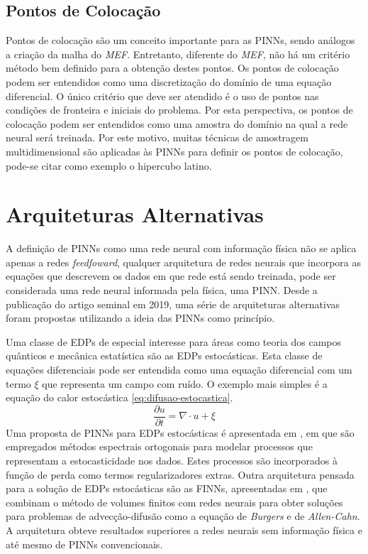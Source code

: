 \subsection{Pontos de Colocação}

Pontos de colocação são um conceito importante para as PINNs, sendo análogos
a criação da malha do \textit{MEF}. Entretanto, diferente do \textit{MEF}, 
não há um critério método bem definido para a obtenção destes pontos. 
Os pontos de colocação podem ser entendidos como uma discretização do domínio
de uma equação diferencial. O único critério que deve ser atendido é o uso
de pontos nas condições de fronteira e iniciais do problema.
Por esta perspectiva, os pontos de colocação podem ser entendidos como uma 
amostra do domínio na qual a rede neural será treinada. 
Por este motivo, muitas técnicas de amostragem multidimensional são 
aplicadas às PINNs para definir os pontos de colocação, pode-se citar como 
exemplo o hipercubo latino.

\section{Arquiteturas Alternativas}

A definição de PINNs como uma rede neural com informação física não se aplica
apenas a redes \textit{feedfoward}, qualquer arquitetura de redes neurais
que incorpora as equações que descrevem os dados em que rede está sendo treinada, 
pode ser considerada uma rede neural informada pela física, uma PINN.
Desde a publicação do artigo seminal em 2019, uma série de arquiteturas 
alternativas foram propostas utilizando a ideia das PINNs como princípio.

Uma classe de EDPs de especial interesse para áreas como teoria dos campos quânticos
e mecânica estatística são as EDPs estocásticas. Esta classe de equações diferenciais
pode ser entendida como uma equação diferencial com um termo $\xi$ que representa
um campo com ruído. 
O exemplo mais simples é a equação do calor estocástica \ref{eq:difusao-estocastica}.
\begin{equation}\label{eq:difusao-estocastica}
    \frac{\partial u}{\partial t} = \nabla \cdot u + \xi
\end{equation}
Uma proposta de PINNs para EDPs estocásticas é apresentada em \cite{zhang-etal:2020-stochastic-pde-pinns},
em que são empregados métodos espectrais ortogonais para modelar processos que 
representam a estocasticidade nos dados. Estes processos são incorporados à função 
de perda como termos regularizadores extras.  
Outra arquitetura pensada para a solução de EDPs estocásticas são as FINNs,
apresentadas em \cite{karlbauer-2022-finns}, que combinam o método de volumes finitos
com redes neurais para obter soluções para problemas de advecção-difusão como a
equação de \textit{Burgers} e de \textit{Allen-Cahn}.
A arquitetura obteve resultados superiores a redes neurais sem informação física
e até mesmo de PINNs convencionais.   

